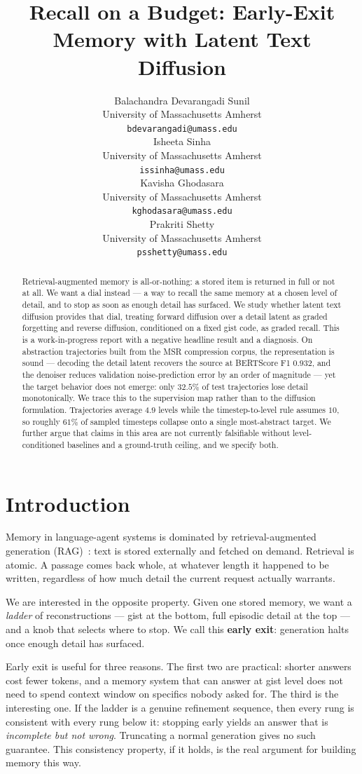 \documentclass{article}
\title{Recall on a Budget: Early-Exit Memory with Latent Text Diffusion}
\author{%
  Balachandra Devarangadi Sunil \\
  University of Massachusetts Amherst \\
  \texttt{bdevarangadi@umass.edu} \\
  \And
  Isheeta Sinha \\
  University of Massachusetts Amherst \\
  \texttt{issinha@umass.edu} \\
  \AND
  Kavisha Ghodasara \\
  University of Massachusetts Amherst \\
  \texttt{kghodasara@umass.edu} \\
  \And
  Prakriti Shetty \\
  University of Massachusetts Amherst \\
  \texttt{psshetty@umass.edu} \\
}
\begin{document}
\maketitle

\begin{abstract}
Retrieval-augmented memory is all-or-nothing: a stored item is returned in full or not at all. We want a dial instead --- a way to recall the same memory at a chosen level of detail, and to stop as soon as enough detail has surfaced. We study whether latent text diffusion provides that dial, treating forward diffusion over a detail latent as graded forgetting and reverse diffusion, conditioned on a fixed gist code, as graded recall. This is a work-in-progress report with a negative headline result and a diagnosis. On abstraction trajectories built from the MSR compression corpus, the representation is sound --- decoding the detail latent recovers the source at BERTScore F1 $0.932$, and the denoiser reduces validation noise-prediction error by an order of magnitude --- yet the target behavior does not emerge: only $32.5\%$ of test trajectories lose detail monotonically. We trace this to the supervision map rather than to the diffusion formulation. Trajectories average $4.9$ levels while the timestep-to-level rule assumes $10$, so roughly $61\%$ of sampled timesteps collapse onto a single most-abstract target. We further argue that claims in this area are not currently falsifiable without level-conditioned baselines and a ground-truth ceiling, and we specify both.
\end{abstract}

\section{Introduction}

Memory in language-agent systems is dominated by retrieval-augmented generation (RAG)~\citep{lewis2020}: text is stored externally and fetched on demand. Retrieval is atomic. A passage comes back whole, at whatever length it happened to be written, regardless of how much detail the current request actually warrants.

We are interested in the opposite property. Given one stored memory, we want a \emph{ladder} of reconstructions --- gist at the bottom, full episodic detail at the top --- and a knob that selects where to stop. We call this \textbf{early exit}: generation halts once enough detail has surfaced.

Early exit is useful for three reasons. The first two are practical: shorter answers cost fewer tokens, and a memory system that can answer at gist level does not need to spend context window on specifics nobody asked for. The third is the interesting one. If the ladder is a genuine refinement sequence, then every rung is consistent with every rung below it: stopping early yields an answer that is \emph{incomplete but not wrong}. Truncating a normal generation gives no such guarantee. This consistency property, if it holds, is the real argument for building memory this way.
\end{document}
